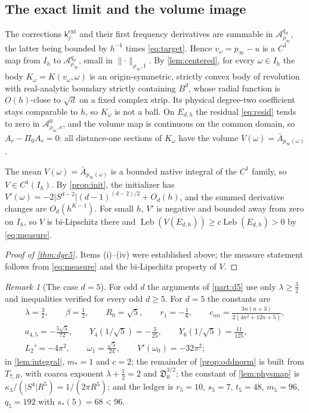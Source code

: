 \documentclass[11pt]{amsart}
\numberwithin{equation}{section}
\theoremstyle{definition}
\theoremstyle{remark}
\newtheorem{remark}[theorem]{Remark}
\newcommand{\abs}[1]{\lvert #1\rvert}
\newcommand{\norm}[1]{\lVert #1\rVert}
\newcommand{\Leb}{\operatorname{Leb}}
\newcommand{\Wn}{\mathcal A}
\newcommand{\Disc}{\mathfrak D}
\begin{document}
\subsection{The exact limit and the volume image}
The corrections $\mathsf k_j^{\mathrm{ext}}$ and their first frequency derivatives are summable in $\Wn^{q_d}_{\rho_\infty}$, the latter being bounded by $h^{-1}$ times \eqref{eq:target}. Hence $v_\omega=p_\infty-u$ is a $C^1$ map from $I_h$ to $\Wn^{q_d}_{\rho_\infty}$, small in $\norm\cdot_{\rho_\infty,1}$. By \cref{lem:centered}, for every $\omega\in I_h$ the body $K_\omega=K(v_\omega,\omega)$ is an origin-symmetric, strictly convex body of revolution with real-analytic boundary strictly containing $B^d$, whose radial function is $O(h)$-close to $\sqrt d$ on a fixed complex strip. Its physical degree-two coefficient stays comparable to $h$, so $K_\omega$ is not a ball. On $E_{d,h}$ the residual \eqref{eq:resid} tends to zero in $\Wn^0_{\rho_\infty,\mathrm e}$, and the volume map is continuous on the common domain, so $A_r-\Pi_0A_r=0$: all distance-one sections of $K_\omega$ have the volume $V(\omega)=\bar A_{p_\infty(\omega)}$.

The mean $V(\omega)=\bar A_{p_\infty(\omega)}$ is a bounded native integral of the $C^1$ family, so $V\in C^1(I_h)$. By \cref{prop:init}, the initializer has $V'(\omega)=-2\abs{S^{d-2}}(d-1)^{(d-2)/2}+O_d(h)$, and the summed derivative changes are $O_d(h^{K-1})$. For small $h$, $V'$ is negative and bounded away from zero on $I_h$, so $V$ is bi-Lipschitz there and $\Leb(V(E_{d,h}))\ge c\Leb(E_{d,h})>0$ by \eqref{eq:measure}.

\begin{proof}[Proof of \cref{thm:dge5}]
Items (i)--(iv) were established above; the measure statement follows from \eqref{eq:measure} and the bi-Lipschitz property of $V$.
\end{proof}

\begin{remark}[The case $d=5$]\label{rem:d5}
For odd $d$ the arguments of \cref{part:d5} use only $\lambda\ge\frac32$ and inequalities verified for every odd $d\ge5$. For $d=5$ the constants are
\begin{gather*}
\lambda=\tfrac32,\qquad \beta=\tfrac12,\qquad R_0=\sqrt5,\qquad r_1=-\tfrac16,\qquad c_{nn}=\frac{3n(n+3)}{2(4n^2+12n+5)},\\
a_{4,5}=-\frac{5\sqrt5}{72},\qquad Y_4(1/\sqrt5)=-\frac3{25},\qquad Y_6(1/\sqrt5)=\frac{11}{125},\\
L_2'=-4\pi^2,\qquad \omega_1=\frac{\sqrt5}{24},\qquad V'(\omega_0)=-32\pi^2;
\end{gather*}
in \cref{lem:integral}, $m_*=1$ and $c=2$; the remainder of \cref{prop:oddnorm} is built from $T_{7,R}$, with coarea exponent $\lambda+\frac12=2$ and $\Disc_0^{3/2}$; the constant of \cref{lem:physmap} is $\kappa_3/(\abs{S^4}R^5)=1/(2\pi R^5)$; and the ledger is $r_5=10$, $s_5=7$, $t_5=48$, $m_5=96$, $q_5=192$ with $s_*(5)=68<96$.
\end{remark}
\end{document}
